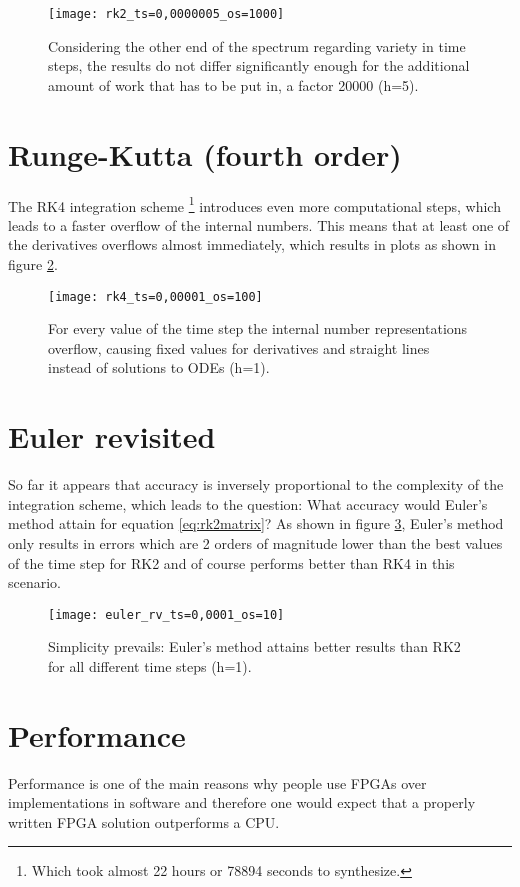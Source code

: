 \begin{figure}[p]
	\centering
	\texttt{[image: rk2\_ts=0,0000005\_os=1000]}
	\caption{Considering the other end of the spectrum regarding variety in time steps, the results do not differ significantly enough for the additional amount of work that has to be put in, a factor 20000 (h=5).}
	\label{f:rk2_ts=0,0000005_os=1000}
\end{figure}

\section{Runge-Kutta (fourth order)}
The RK4 integration scheme \footnote{Which took almost 22 hours or 78894 seconds to synthesize.} introduces even more computational steps, which leads to a faster overflow of the internal numbers. This means that at least one of the derivatives overflows almost immediately, which results in plots as shown in figure \ref{f:rk4_ts=0,00001_os=100}.

\begin{figure}[h]
	\centering
	\texttt{[image: rk4\_ts=0,00001\_os=100]}
	\caption{For every value of the time step the internal number representations overflow, causing fixed values for derivatives and straight lines instead of solutions to ODEs (h=1).}
	\label{f:rk4_ts=0,00001_os=100}
\end{figure}

\section{Euler revisited}
So far it appears that accuracy is inversely proportional to the complexity of the integration scheme, which leads to the question: What accuracy would Euler's method attain for equation \ref{eq:rk2matrix}? As shown in figure \ref{f:euler_rv_ts=0,0001_os=10}, Euler's method only results in errors which are 2 orders of magnitude lower than the best values of the time step for RK2 and of course performs better than RK4 in this scenario. 

\begin{figure}[h]
	\centering
	\texttt{[image: euler\_rv\_ts=0,0001\_os=10]}
	\caption{Simplicity prevails: Euler's method attains better results than RK2 for all different time steps (h=1).}
	\label{f:euler_rv_ts=0,0001_os=10}
\end{figure}

\section{Performance}
Performance is one of the main reasons why people use FPGAs over implementations in software and therefore one would expect that a properly written FPGA solution outperforms a CPU. 

